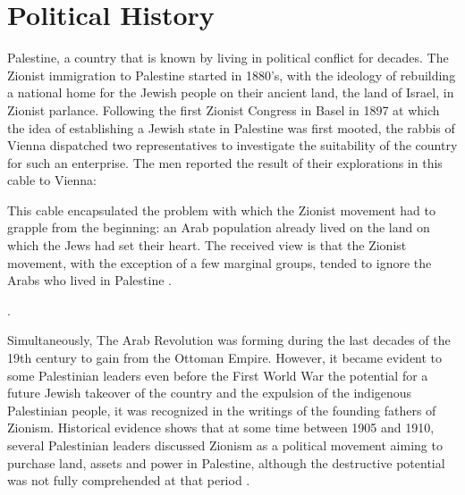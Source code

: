 
\section{Political History}
Palestine, a country that is known by living in political conflict for decades.
The Zionist immigration to Palestine started in 1880's, with the ideology of rebuilding a national home for the Jewish people on their ancient land, the land of Israel, in Zionist parlance\citep{Morris2004}\citep{Pappe2006}\citep{Khalidi2015}.
Following the first Zionist Congress in Basel in 1897 at which the idea of
establishing a Jewish state in Palestine was first mooted, the rabbis of Vienna
dispatched two representatives to investigate the suitability of the country for
such an enterprise. The men reported the result of their explorations in this cable
to Vienna:




\centerline{\textit{}}

This cable encapsulated the problem with which the Zionist movement had to grapple from the beginning: an Arab population already lived on the land on which the Jews had set their heart. The received view is that the Zionist movement, with the exception of a few marginal groups, tended to ignore the Arabs who lived in Palestine \citep{Shlaim2014}\citep{Karmi2007}.

 \cite[p.11]{Pappe2006}.

Simultaneously, The Arab Revolution was forming during the last decades of the 19th century to gain  from the Ottoman Empire. However, it became evident to some Palestinian leaders even before the First World War the potential for a future Jewish takeover of the country and the expulsion of the indigenous Palestinian people, it was recognized in the writings of the founding fathers of Zionism. Historical evidence shows that at some time between 1905 and 1910, 
several Palestinian leaders discussed Zionism as a political movement 
aiming to purchase land, assets and power in Palestine, although the 
destructive potential was not fully comprehended at that period \citep{Pappe2006}.



